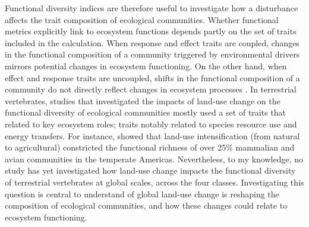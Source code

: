 Functional diversity indices are therefore useful to investigate how a disturbance affects the trait composition of ecological communities. Whether functional metrics explicitly link to ecosystem functions depends partly on the set of traits included in the calculation. When response and effect traits are coupled, changes in the functional composition of a community triggered by environmental drivers mirrors potential changes in ecosystem functioning. On the other hand, when effect and response traits are uncoupled, shifts in the functional composition of a community do not directly reflect changes in ecosystem processes \citep{Luck2013}. In terrestrial vertebrates, studies that investigated the impacts of land-use change on the functional diversity of ecological communities mostly used a set of traits that related to key ecosystem roles; traits notably related to species resource use and energy transfers. For instance, \citet{Flynn2009} showed that land-use intensification (from natural to agricultural) constricted the functional richness of over 25\% mammalian and avian communities in the temperate Americas. Nevertheless, to my knowledge, no study has yet investigated how land-use change impacts the functional diversity of terrestrial vertebrates at global scales, across the four classes. Investigating this question is central to understand of global land-use change is reshaping the composition of ecological communities, and how these changes could relate to ecosystem functioning.

